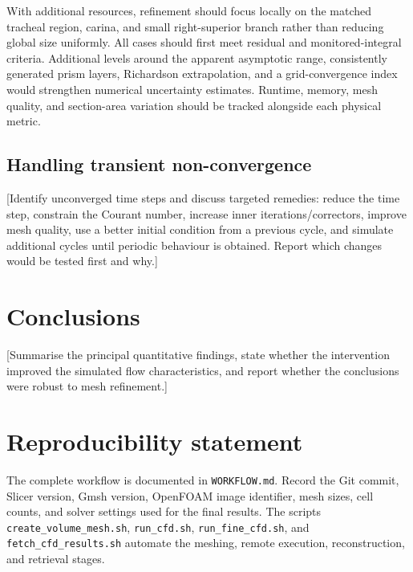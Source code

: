 \documentclass[11pt,a4paper]{article}
\begin{document}
With additional resources, refinement should focus locally on the matched
tracheal region, carina, and small right-superior branch rather than reducing
global size uniformly. All cases should first meet residual and monitored-integral
criteria. Additional levels around the apparent asymptotic range, consistently
generated prism layers, Richardson extrapolation, and a grid-convergence index
would strengthen numerical uncertainty estimates. Runtime, memory, mesh quality,
and section-area variation should be tracked alongside each physical metric.

\subsection{Handling transient non-convergence}

[Identify unconverged time steps and discuss targeted remedies: reduce the time
step, constrain the Courant number, increase inner iterations/correctors,
improve mesh quality, use a better initial condition from a previous cycle, and
simulate additional cycles until periodic behaviour is obtained. Report which
changes would be tested first and why.]

\section{Conclusions}
\label{sec:conclusions}

[Summarise the principal quantitative findings, state whether the intervention
improved the simulated flow characteristics, and report whether the conclusions
were robust to mesh refinement.]

\section*{Reproducibility statement}

The complete workflow is documented in \texttt{WORKFLOW.md}. Record the Git
commit, Slicer version, Gmsh version, OpenFOAM image identifier, mesh sizes,
cell counts, and solver settings used for the final results. The scripts
\texttt{create\_volume\_mesh.sh}, \texttt{run\_cfd.sh},
\texttt{run\_fine\_cfd.sh}, and \texttt{fetch\_cfd\_results.sh} automate the
meshing, remote execution, reconstruction, and retrieval stages.
\end{document}
